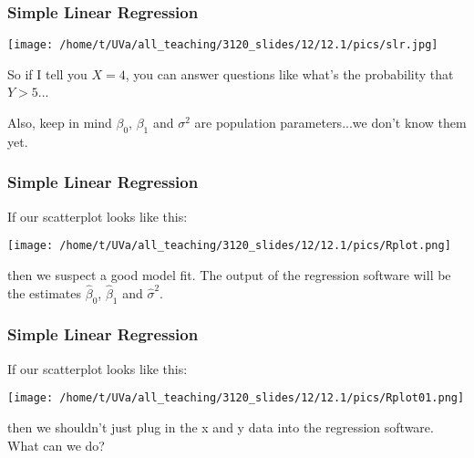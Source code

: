 \documentclass{beamer}
\begin{document}
\begin{frame}
\frametitle{Simple Linear Regression}

\begin{center}
\texttt{[image: /home/t/UVa/all\_teaching/3120\_slides/12/12.1/pics/slr.jpg]}
\end{center}

So if I tell you $X = 4$, you can answer questions like what's the probability that $Y > 5$...
\newline

Also, keep in mind $\beta_0$, $\beta_1$ and $\sigma^2$ are population parameters...we don't know them yet.

\end{frame}
\begin{frame}
\frametitle{Simple Linear Regression}

If our scatterplot looks like this:
\begin{center}
\texttt{[image: /home/t/UVa/all\_teaching/3120\_slides/12/12.1/pics/Rplot.png]}
\end{center}

then we suspect a good model fit. The output of the regression software will be the estimates $\hat{\beta}_0$, $\hat{\beta}_1$ and $\hat{\sigma}^2$.


\end{frame}
\begin{frame}
\frametitle{Simple Linear Regression}

If our scatterplot looks like this:
\begin{center}
\texttt{[image: /home/t/UVa/all\_teaching/3120\_slides/12/12.1/pics/Rplot01.png]}
\end{center}

then we shouldn't just plug in the x and y data into the regression software. What can we do?


\end{frame}
\end{document}
